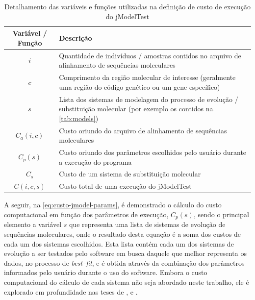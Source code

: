 \documentclass[english,brazilian]{UNISINOSmonografia} %
\newcommand\defaultFigureWidth{0.9}
\renewcommand{\arraystretch}{1.3}
\begin{document}
\begin{table}[tb]
\centering%
\begin{minipage}{\defaultFigureWidth\textwidth}
	\caption{Detalhamento das variáveis e funções utilizadas na definição de custo de execução do jModelTest}
	\label{tab:custo-jmodel-elementos}
	\small
	\vspace{1ex}
	\renewcommand\arraystretch{1.4}
	\renewcommand {\tabularxcolumn}[1]{>{\arraybackslash}m{#1}}
	\begin{tabularx}{\textwidth}{cX@{}}
		\toprule
		Variável / Função & Descrição \\ 
		\midrule
		$ i $ & Quantidade de indivíduos / amostras contidos no arquivo de alinhamento de sequências moleculares \\
		$ c $ & Comprimento da região molecular de interesse (geralmente uma região do código genético ou um gene específico) \\
		$ s $ & Lista dos sistemas de modelagem do processo de evolução / substituição molecular (por exemplo os contidos na \autoref{tab:models}) \\
		$ C_a(i,c) $ & Custo oriundo do arquivo de alinhamento de sequências moleculares \\
		$ C_p(s) $ & Custo oriundo dos parâmetros escolhidos pelo usuário durante a execução do programa \\
		$ C_s $ & Custo de um sistema de substituição molecular \\
		$ C(i,c,s) $ & Custo total de uma execução do jModelTest \\
		\bottomrule	
	\end{tabularx}
\end{minipage}
\end{table}


A seguir, na \autoref{eq:custo-jmodel-params}, é demonstrado o cálculo do custo computacional em função dos parâmetros de execução, $ C_p(s) $, sendo o principal elemento a variável $ s $ que representa uma lista de sistemas de evolução de sequências moleculares, onde o resultado desta equação é a soma dos custos de cada um dos sistemas escolhidos. 
Esta lista contém cada um dos sistemas de evolução a ser testados pelo software em busca daquele que melhor representa os dados, no processo de \textit{best--fit}, e é obtida através da combinação dos parâmetros informados pelo usuário durante o uso do software.
Embora o custo computacional do cálculo de cada sistema não seja abordado neste trabalho, ele é explorado em profundidade nas teses de ,  e .
\end{document}

